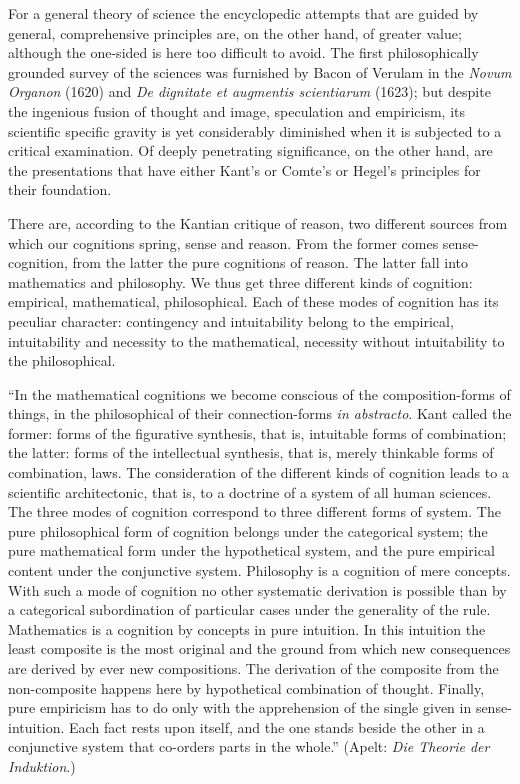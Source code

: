 \documentclass[12pt]{book}
\begin{document}
For a general theory of science the encyclopedic attempts that are guided by
general, comprehensive principles are, on the other hand, of greater value;
although the one-sided is here too difficult to avoid. The first
philosophically grounded survey of the sciences was furnished by Bacon of
Verulam in the \textit{Novum Organon} (1620) and \textit{De dignitate et
augmentis scientiarum} (1623); but despite the ingenious fusion of thought and
image, speculation and empiricism, its scientific specific gravity is yet
considerably diminished when it is subjected to a critical examination. Of
deeply penetrating significance, on the other hand, are the presentations that
have either Kant's or Comte's or Hegel's principles for their foundation.

There are, according to the Kantian critique of reason, two different sources
from which our cognitions spring, sense and reason. From the former comes
sense-cognition, from the latter the pure cognitions of reason. The latter fall
into mathematics and philosophy. We thus get three different kinds of cognition:
empirical, mathematical, philosophical. Each of these modes of cognition has its
peculiar character: contingency and intuitability belong to the empirical,
intuitability and necessity to the mathematical, necessity without
intuitability to the philosophical.

``In the mathematical cognitions we become conscious of the
composition-forms of things, in the philosophical of their connection-forms
\textit{in abstracto}. Kant called the former: forms of the figurative
synthesis, that is, intuitable forms of combination; the latter: forms of the
intellectual synthesis, that is, merely thinkable forms of combination, laws.
The consideration of the different kinds of cognition leads to a scientific
architectonic, that is, to a doctrine of a system of all human sciences. The
three modes of cognition correspond to three different forms of system. The
pure philosophical form of cognition belongs under the categorical system; the
pure mathematical form under the hypothetical system, and the pure empirical
content under the conjunctive system. Philosophy is a cognition of mere
concepts. With such a mode of cognition no other systematic derivation is
possible than by a categorical subordination of particular cases under the
generality of the rule. Mathematics is a cognition by concepts in pure
intuition. In this intuition the least composite is the most original and the
ground from which new consequences are derived by ever new compositions. The
derivation of the composite from the non-composite happens here by hypothetical
combination of thought. Finally, pure empiricism has to do only with the
apprehension of the single given in sense-intuition. Each fact rests upon
itself, and the one stands beside the other in a conjunctive system that
co-orders parts in the whole.'' (Apelt: \textit{Die Theorie der Induktion}.)
\end{document}
